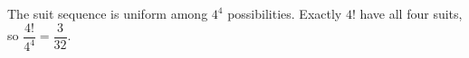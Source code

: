 The suit sequence is uniform among $ 4^4 $ possibilities. Exactly $ 4!$ have all four suits, so $\boxed{\dfrac{4!}{4^4}=\dfrac{3}{32}}$.
